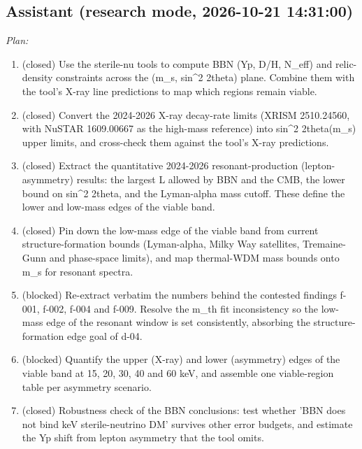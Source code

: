 \documentclass[11pt,a4paper]{article}
\begin{document}
\subsection*{Assistant \small(research mode, 2026-10-21 14:31:00)}
\textit{Plan:}\begin{enumerate}
  \item (closed) Use the sterile-nu tools to compute BBN (Yp, D/H, N\_eff) and relic-density constraints across the (m\_s, sin\textasciicircum{}2 2theta) plane. Combine them with the tool's X-ray line predictions to map which regions remain viable.
  \item (closed) Convert the 2024-2026 X-ray decay-rate limits (XRISM 2510.24560, with NuSTAR 1609.00667 as the high-mass reference) into sin\textasciicircum{}2 2theta(m\_s) upper limits, and cross-check them against the tool's X-ray predictions.
  \item (closed) Extract the quantitative 2024-2026 resonant-production (lepton-asymmetry) results: the largest L allowed by BBN and the CMB, the lower bound on sin\textasciicircum{}2 2theta, and the Lyman-alpha mass cutoff. These define the lower and low-mass edges of the viable band.
  \item (closed) Pin down the low-mass edge of the viable band from current structure-formation bounds (Lyman-alpha, Milky Way satellites, Tremaine-Gunn and phase-space limits), and map thermal-WDM mass bounds onto m\_s for resonant spectra.
  \item (blocked) Re-extract verbatim the numbers behind the contested findings f-001, f-002, f-004 and f-009. Resolve the m\_th fit inconsistency so the low-mass edge of the resonant window is set consistently, absorbing the structure-formation edge goal of d-04.
  \item (blocked) Quantify the upper (X-ray) and lower (asymmetry) edges of the viable band at 15, 20, 30, 40 and 60 keV, and assemble one viable-region table per asymmetry scenario.
  \item (closed) Robustness check of the BBN conclusions: test whether 'BBN does not bind keV sterile-neutrino DM' survives other error budgets, and estimate the Yp shift from lepton asymmetry that the tool omits.
\end{enumerate}
\end{document}
